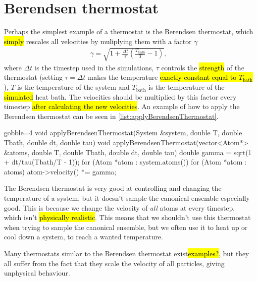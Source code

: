 \section{Berendsen thermostat}
Perhaps the simplest example of a thermostat is the Berendsen thermostat\cite{berendsen1984molecular}, which \hl{simply} rescales all velocities by muliplying them with a factor $\gamma$
\begin{align*}
    \gamma = \sqrt{1 + \frac{\Delta t}{\tau}\left(\frac{T_\text{bath}}{T} - 1\right)},
\end{align*}
where $\Delta t$ is the timestep used in the simulations, $\tau$ controls the \hl{strength} of the thermostat (setting $\tau = \Delta t$ makes the temperature \hl{exactly constant equal to $T_\text{bath}$}), $T$ is the temperature of the system and $T_\text{bath}$ is the temperature of the \hl{simulated} heat bath. The velocities should be multiplied by this factor every timestep \hl{after calculating the new velocities}. An example of how to apply the Berendsen thermostat can be seen in \cref{list:applyBerendsenThermostat}.
%
\begin{listing}[!htb]%
\begin{cppcode*}{gobble=4}
    void applyBerendsenThermostat(System &system, double T, double Tbath, 
        double dt, double tau)
    void applyBerendsenThermostat(vector<Atom*> &atoms, double T, double Tbath, 
        double dt, double tau)
    {
        double gamma = sqrt(1 + dt/tau(Tbath/T - 1));
        for (Atom *atom : system.atoms())
        for (Atom *atom : atoms)
        {
            atom->velocity() *= gamma;
        }
    }
\end{cppcode*}
\caption{%
    \texttt{applyBerendsenThermostat}. \hl{decide on System or vector<Atom*> as input}%
    \label{list:applyBerendsenThermostat}%
}%
\end{listing}%

The Berendsen thermostat is very good at controlling and changing the temperature of a system, but it doesn't sample the canonical ensemble especially good. This is because we change the velocity of \emph{all} atoms at every timestep, which isn't \hl{physically realistic}. This means that we shouldn't use this thermostat when trying to sample the canonical ensemble, but we often use it to heat up or cool down a system, to reach a wanted temperature.

Many thermostats similar to the Berendsen thermostat exist\hl{examples?}, but they all suffer from the fact that they scale the velocity of all particles, giving unphysical behaviour.

